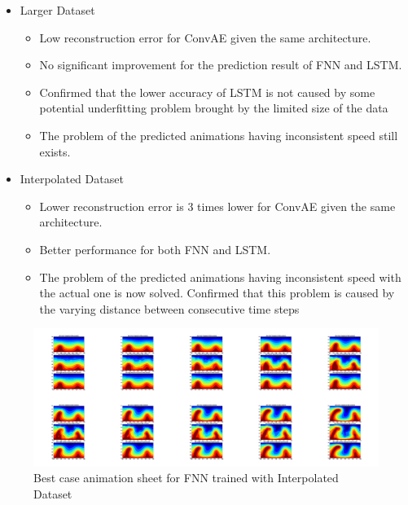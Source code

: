 {\begin{itemize}
\begin{itemize}
        \end{itemize}
        
    \item Larger Dataset
        \begin{itemize}
            \item Low reconstruction error for ConvAE given the same architecture.

            \item No significant improvement for the prediction result of FNN and LSTM.

            \item Confirmed that the lower accuracy of LSTM is not caused by some potential underfitting problem brought by the limited size of the data
            
            \item The problem of the predicted animations having inconsistent speed still exists.
            
        \end{itemize}

        
    \item Interpolated Dataset
    
    \begin{itemize}
            \item Lower reconstruction error is 3 times lower for ConvAE given the same architecture.

            \item Better performance for both FNN and LSTM.
            
            \item The problem of the predicted animations having inconsistent speed with the actual one is now solved. Confirmed that this problem is caused by the varying distance between consecutive time steps
            
    \end{itemize} 
 
        
\end{itemize}

\begin{figure}[H]
    \includegraphics[width=\linewidth]{figures/FNN_Best_GIF_sheet.png}
    \caption{Best case animation sheet for FNN trained with Interpolated Dataset}
\end{figure}

}
